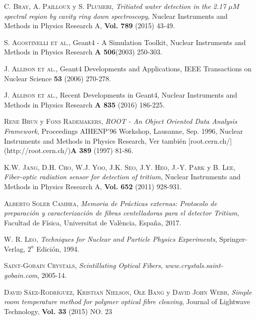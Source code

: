 \begin{thebibliography}{99}
 \textsc{C. Bray}, \textsc{A. Pailloux} y \textsc{S. Plumeri},
\textit{Tritiated water detection in the 2.17 $\mu M$ spectral region by cavity ring down spectroscopy}, Nuclear Instruments and Methods in Physics Research A, \textbf{Vol. 789} (2015) 43-49.

 \textsc { S. Agostinelli et al.}, Geant4 - A Simulation Toolkit, Nuclear Instruments and Methods  in Physics Research {\bf A 506}(2003) 250-303.

\textsc {J. Allison et al.}, Geant4 Developments and Applications, IEEE Transactions on Nuclear Science {\bf 53}  (2006) 270-278.

\textsc {J. Allison et al.}, Recent Developments in Geant4,  Nuclear Instruments and Methods   in Physics Research {\bf A 835} (2016) 186-225.

\textsc {Rene Brun} y \textsc{Fons Rademakers}, \textit{ROOT - An Object Oriented Data Analysis Framework}, Proceedings AIHENP'96 Workshop, Lausanne, Sep. 1996, Nuclear Instruments and Methods in Physics Research, Ver también  [root.cern.ch/](http://root.cern.ch/){\bf A 389} (1997) 81-86.


 \textsc{K.W. Jang}, \textsc{D.H. Cho}, \textsc{W.J. Yoo}, \textsc{J.K. Seo}, \textsc{J.Y. Heo}, \textsc{J.-Y. Park} y \textsc{B. Lee},
\textit{Fiber-optic radiation sensor for detection of tritium}, Nuclear Instruments and Methods in Physics Research A, \textbf{Vol. 652} (2011) 928-931.

 \textsc{Alberto Soler Cambra},
\textit{ Memoria de Prácticas externas: Protocolo de preparación y caracterización de fibras centelladoras para el detector Tritium}, Facultad de Física, Universitat de València, España, 2017.

 \textsc{W. R. Leo},
\textit{Techniques for Nuclear and Particle Physics Experiments}, Springer-Verlag, $2^a$ Edición, 1994. 

 \textsc{Saint-Gobain Crystals},
\textit{Scintillating Optical Fibers}, \textit{www.crystals.saint-gobain.com}, 2005-14.

 \textsc{David Sáez-Rodríguez}, \textsc{Kristian Nielson}, \textsc{Ole Bang} y \textsc{David John Webb},
\textit{Simple room temperature method for polymer optical fibre cleaving}, Journal of Lightwave Technology, \textbf{Vol. 33} (2015) \textsc{NO. 23} 


\end{thebibliography}
